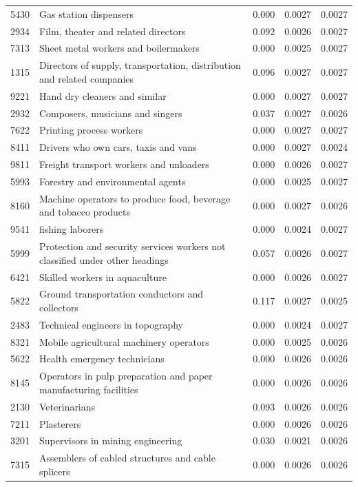 \begin{longtable}{p{}>{\raggedright\arraybackslash}p{}rrr}
5430 & Gas station dispensers & 0.000 & 0.0027 & 0.0027 \\
2934 & Film, theater and related directors & 0.092 & 0.0026 & 0.0027 \\
7313 & Sheet metal workers and boilermakers & 0.000 & 0.0025 & 0.0027 \\
1315 & Directors of supply, transportation, distribution and related companies & 0.096 & 0.0027 & 0.0027 \\
9221 & Hand dry cleaners and similar & 0.000 & 0.0027 & 0.0027 \\
2932 & Composers, musicians and singers & 0.037 & 0.0027 & 0.0026 \\
7622 & Printing process workers & 0.000 & 0.0027 & 0.0027 \\
8411 & Drivers who own cars, taxis and vans & 0.000 & 0.0027 & 0.0024 \\
9811 & Freight transport workers and unloaders & 0.000 & 0.0026 & 0.0027 \\
5993 & Forestry and environmental agents & 0.000 & 0.0025 & 0.0027 \\
8160 & Machine operators to produce food, beverage and tobacco products & 0.000 & 0.0027 & 0.0026 \\
9541 & fishing laborers & 0.000 & 0.0024 & 0.0027 \\
5999 & Protection and security services workers not classified under other headings & 0.057 & 0.0026 & 0.0027 \\
6421 & Skilled workers in aquaculture & 0.000 & 0.0026 & 0.0027 \\
5822 & Ground transportation conductors and collectors & 0.117 & 0.0027 & 0.0025 \\
2483 & Technical engineers in topography & 0.000 & 0.0024 & 0.0027 \\
8321 & Mobile agricultural machinery operators & 0.000 & 0.0025 & 0.0026 \\
5622 & Health emergency technicians & 0.000 & 0.0026 & 0.0026 \\
8145 & Operators in pulp preparation and paper manufacturing facilities & 0.000 & 0.0026 & 0.0026 \\
2130 & Veterinarians & 0.093 & 0.0026 & 0.0026 \\
7211 & Plasterers & 0.000 & 0.0026 & 0.0026 \\
3201 & Supervisors in mining engineering & 0.030 & 0.0021 & 0.0026 \\
7315 & Assemblers of cabled structures and cable splicers & 0.000 & 0.0026 & 0.0026 \\

\end{longtable}
